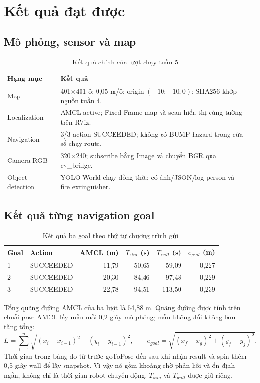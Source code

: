 \documentclass[a4paper,11pt]{article}
\begin{document}
\section{Kết quả đạt được}
\subsection{Mô phỏng, sensor và map}
\begin{table}[H]\centering\small
\begin{tabular}{@{}p{3.2cm}p{12.5cm}@{}}\toprule
Hạng mục & Kết quả\\\midrule
Map & 401$\times$401 ô; 0,05 m/ô; origin $(-10;-10;0)$; SHA256 khớp nguồn tuần 4.\\
Localization & AMCL active; Fixed Frame map và scan hiển thị cùng tường trên RViz.\\
Navigation & 3/3 action SUCCEEDED; không có BUMP hazard trong cửa sổ chạy route.\\
Camera RGB & 320$\times$240; subscribe bằng Image và chuyển BGR qua cv\_bridge.\\
Object detection & YOLO-World chạy đồng thời; có ảnh/JSON/log person và fire extinguisher.\\\bottomrule
\end{tabular}
\caption{Kết quả chính của lượt chạy tuần 5.}
\end{table}

\subsection{Kết quả từng navigation goal}
\begin{table}[H]\centering\small
\begin{tabular}{@{}llrrrr@{}}\toprule
Goal & Action & AMCL (m) & $T_{sim}$ (s) & $T_{wall}$ (s) & $e_{goal}$ (m)\\\midrule
1 & SUCCEEDED & 11,79 & 50,65 & 59,09 & 0,227 \\
2 & SUCCEEDED & 20,30 & 84,46 & 97,48 & 0,229 \\
3 & SUCCEEDED & 22,78 & 94,51 & 113,50 & 0,239 \\
\bottomrule\end{tabular}
\caption{Kết quả ba goal theo thứ tự chương trình gửi.}
\end{table}

Tổng quãng đường AMCL của ba lượt là 54,88 m. Quãng đường được tính
trên chuỗi pose AMCL lấy mẫu mỗi 0,2 giây mô phỏng; mẫu không đổi không làm tăng tổng:
\[
L=\sum_{i=1}^{n}\sqrt{(x_i-x_{i-1})^2+(y_i-y_{i-1})^2},\qquad
e_{goal}=\sqrt{(x_f-x_g)^2+(y_f-y_g)^2}.
\]
Thời gian trong bảng đo từ trước goToPose đến sau khi nhận result và spin thêm
0,5 giây wall để lấy snapshot. Vì vậy nó gồm khoảng chờ phản hồi và ổn định ngắn,
không chỉ là thời gian robot chuyển động. $T_{sim}$ và $T_{wall}$ được giữ riêng.
\end{document}

